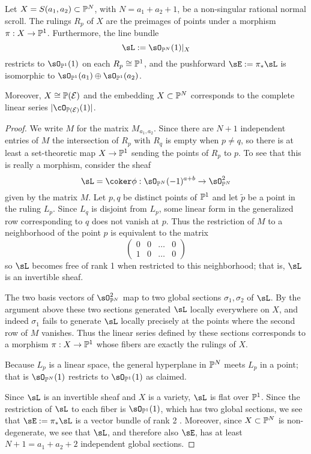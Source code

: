 \begin{theorem}\label{scroll as proj}
Let $X = S(a_{1}, a_{2})\subset \PP^{N}$, with $N = a_{1}+a_{2}+1$, be a non-singular rational normal scroll. The rulings $R_{p}$ of $X$ are the preimages of points under a morphism $\pi: X\to \PP^{1}$. Furthermore, the line bundle 
$$
\sL := \sO_{\PP^{N}}(1)|_{X}
$$ 
restricts to $\sO_{\PP^{1}}(1)$ on each $R_{p} \cong \PP^{1}$, and the pushforward
$\sE := \pi_{*}\sL$ is isomorphic to 
$\sO_{\PP^{1}}(a_{1})\oplus \sO_{\PP^{1}}(a_{2})$. 

Moreover, $X\cong \PP(\cE)$ and the embedding $X\subset \PP^N$ corresponds to the complete linear series $|\cO_{\PP(\cE)}(1)|$.
\end{theorem} 

\begin{proof} We write $M$ for the matrix $M_{a_{1}, a_{2}}$.
Since there are $N+1$ independent entries of $M$ the intersection
of $R_{p}$ with $R_{q}$ is empty when $p\neq q$, so there is at least a set-theoretic map $X\to \PP^{1}$ sending the points of $R_{p}$ to $p$. To see that this is really a morphism, consider the sheaf
$$
\sL = \coker \phi: \sO_{\PP^{N}}(-1)^{a+b} \to \sO_{\PP^{N}}^{2}
$$
given by the matrix $M$. Let $p,q$ be distinct points of $\PP^{1}$ and  let
$\tilde p$ be a point in the ruling $L_p$. Since $L_q$ is disjoint from $L_{p}$, some linear form in the generalized row corresponding to $q$ does not vanish at $p$. Thus
the restriction of $M$ to a neighborhood of the point $p$ is equivalent to the matrix
$$
\begin{pmatrix}
0&0&\dots&0 \\
1&0&\dots&0 
\end{pmatrix}
$$
so $\sL$ becomes free of rank 1 when restricted to this neighborhood; that is, $\sL$ is an invertible sheaf.

The two basis vectors of $\sO_{\PP^{N}}^{2}$ map to two global sections
$\sigma_{1},\sigma_{2}$ of $\sL$. By the argument above these two sections generated $\sL$ locally everywhere on $X$, and indeed $\sigma_{1}$ fails to generate $\sL$ locally precisely at the points where the second row of $M$ vanishes. Thus the linear series
defined by these sections corresponds to a morphism $\pi: X \to \PP^{1}$ whose fibers are exactly the rulings of $X$. 

Because  $L_{p}$ is a linear space, the general hyperplane in $\PP^{N}$
meets $L_{p}$ in a point; that is $\sO_{\PP^{N}}(1)$ restricts to $\sO_{\PP^{1}}(1)$ as claimed.

Since $\sL$ is an invertible sheaf and $X$ is a variety, $\sL$ is flat over $\PP^{1}$. Since the restriction of $\sL$ to each fiber is $\sO_{\PP^{1}}(1)$, which has two global sections, we see that $\sE:= \pi_{*}\sL$ is a vector bundle of rank 2 \cite[Theorem III.12.9]{Hartshorne1977}.
Moreover, since $X\subset \PP^{N}$ is non-degenerate, we see that $\sL$, and therefore also $\sE$, has at least $N+1 = a_{1}+a_{2}+2$ independent global sections. 


\end{proof}

